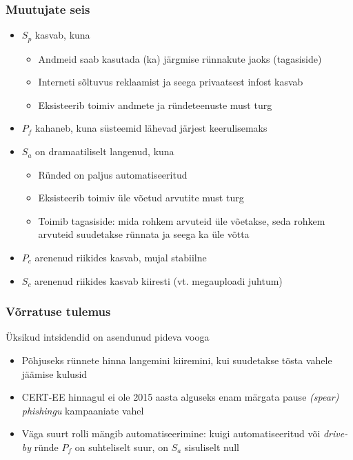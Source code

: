 \begin{frame}[fragile]
  \frametitle{Muutujate seis}
	\begin{itemize}
		\item $S_p$ kasvab, kuna 
			\begin{itemize}
				\item Andmeid saab kasutada (ka) järgmise rünnakute jaoks (tagasiside) 
				\item Interneti sõltuvus reklaamist ja seega privaatsest infost kasvab
				\item Eksisteerib toimiv andmete ja ründeteenuste must turg
			\end{itemize}
		\item $P_f$ kahaneb, kuna süsteemid lähevad järjest keerulisemaks
		\item $S_a$ on dramaatiliselt langenud, kuna 
			\begin{itemize}
				\item Ründed on paljus automatiseeritud
				\item Eksisteerib toimiv üle võetud arvutite must turg
				\item Toimib tagasiside: mida rohkem arvuteid üle võetakse, seda rohkem arvuteid suudetakse rünnata ja seega ka üle võtta
			\end{itemize}
		\item $P_c$ arenenud riikides kasvab, mujal stabiilne
		\item $S_c$ arenenud riikides kasvab kiiresti (vt. megauploadi juhtum)
	\end{itemize}
\end{frame}


\begin{frame}[fragile]
  \frametitle{Võrratuse tulemus}
	Üksikud intsidendid on asendunud pideva vooga
	\begin{itemize}
		\item Põhjuseks rünnete hinna langemini kiiremini, kui suudetakse tõsta vahele jäämise kulusid
		\item CERT-EE hinnagul ei ole 2015 aasta alguseks enam märgata pause \emph{(spear) phishingu} kampaaniate vahel
		\item Väga suurt rolli mängib automatiseerimine: kuigi automatiseeritud või \emph{drive-by} ründe $P_f$ on suhteliselt suur, on $S_a$ sisuliselt null
	\end{itemize}
\end{frame}

